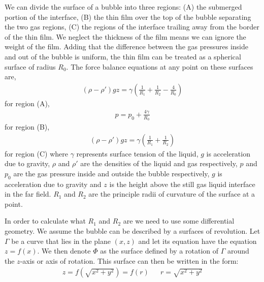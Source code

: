 We can divide the surface of a bubble into three regions: (A) the submerged portion of the interface, (B) the thin film over the top of the bubble separating the two gas regions, (C) the regions of the interface trailing away from the border of the thin film. We neglect the thickness of the film means we can ignore the weight of the film. Adding that the difference between the gas pressures inside and out of the bubble is uniform, the thin film can be treated as a spherical surface of radius $R_0$. The force balance equations at any point on these surfaces are,
\begin{align}\label{A_untransformed}
    (\rho-\rho')gz = \gamma \left( \frac{1}{R_1}+\frac{1}{R_2}-\frac{4}{R_0} \right)
\end{align}
for region (A),
\begin{align}\label{B_untransformed}
    p=p_0 + \frac{4\gamma}{R_0}
\end{align}
for region (B),
\begin{align}\label{C_untransformed}
    (\rho-\rho')gz = \gamma(\frac{1}{R_1}+\frac{1}{R_2})
\end{align}
for region (C) where $\gamma$ represents surface tension of the liquid, $g$ is acceleration due to gravity, $\rho$ and $\rho'$ are the densities of the liquid and gas respectively, $p$ and $p_0$ are the gas pressure inside and outside the bubble respectively, $g$ is acceleration due to gravity and $z$ is the height above the still gas liquid interface in the far field. $R_1$ and $R_2$ are the principle radii of curvature of the surface at a point.

In order to calculate what $R_1$ and $R_2$ are we need to use some differential geometry. We assume the bubble can be described by a surfaces of revolution.
Let $\Gamma$ be a curve that lies in the plane $(x,z)$ and let its equation have the equation $z=f(x)$. We then denote $\Phi$ as the surface defined by a rotation of $\Gamma$ around the $z$-axis or axis of rotation. This surface can then be written in the form:
\begin{align}
    z=f(\sqrt{x^2+y^2})=f(r) && r=\sqrt{x^2+y^2}
\end{align}

